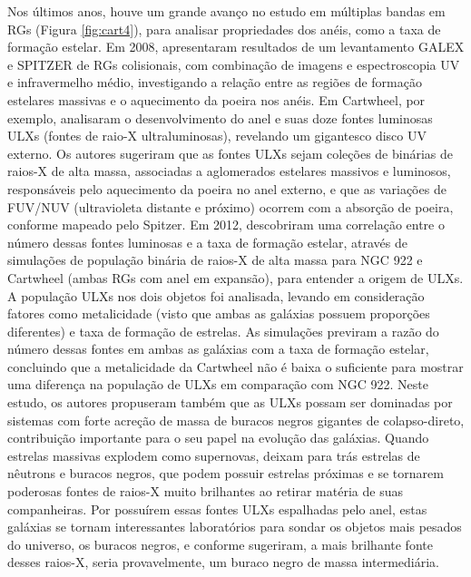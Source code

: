 Nos últimos anos, houve um grande avanço no estudo em múltiplas bandas em RGs (Figura \ref{fig:cart4}), para analisar propriedades dos anéis, como a taxa de formação estelar. Em 2008,  apresentaram resultados de um levantamento GALEX e SPITZER de RGs colisionais, com combinação de imagens e espectroscopia UV e infravermelho médio, investigando a relação entre as regiões de formação estelares massivas e o aquecimento da poeira nos anéis. Em Cartwheel, por exemplo, analisaram o desenvolvimento do anel e suas doze fontes luminosas ULXs (fontes de raio-X ultraluminosas), revelando um gigantesco disco UV externo. Os autores sugeriram que as fontes ULXs sejam coleções de binárias de raios-X de alta massa, associadas a aglomerados estelares massivos e luminosos, responsáveis pelo aquecimento da poeira no anel externo, e que as variações de FUV/NUV (ultravioleta distante e próximo) ocorrem com a absorção de poeira, conforme mapeado pelo Spitzer. Em 2012,  descobriram uma correlação entre o número dessas fontes luminosas e a taxa de formação estelar, através de simulações de população binária de raios-X de alta massa para NGC 922 e Cartwheel (ambas RGs com anel em expansão), para entender a origem de ULXs. A população ULXs nos dois objetos foi analisada, levando em consideração fatores como metalicidade (visto que ambas as galáxias possuem proporções diferentes) e taxa de formação de estrelas. As simulações previram a razão do número dessas fontes em ambas as galáxias com a taxa de formação estelar, concluindo que a metalicidade da Cartwheel não é baixa o suficiente para mostrar uma diferença na população de ULXs em comparação com NGC 922. Neste estudo, os autores propuseram também que as ULXs possam ser dominadas por sistemas com forte acreção de massa de buracos negros gigantes de colapso-direto, contribuição importante para o seu papel na evolução das galáxias. Quando estrelas massivas explodem como supernovas, deixam para trás estrelas de nêutrons e buracos negros, que podem possuir estrelas próximas e se tornarem poderosas fontes de raios-X muito brilhantes ao retirar matéria de suas companheiras. Por possuírem essas fontes ULXs espalhadas pelo anel, estas galáxias se tornam interessantes laboratórios para sondar os objetos mais pesados do universo, os buracos negros, e conforme  sugeriram, a mais brilhante fonte desses raios-X, seria provavelmente, um buraco negro de massa intermediária.

